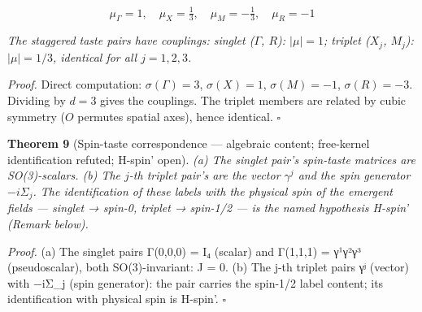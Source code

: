 \documentclass[
]{article}
\begin{document}
\[\mu_\Gamma = 1, \quad \mu_X = \tfrac{1}{3}, \quad \mu_M = -\tfrac{1}{3}, \quad \mu_R = -1\]

\emph{The staggered taste pairs have couplings: singlet (\(\Gamma\),
\(R\)): \(|\mu| = 1\); triplet (\(X_j\), \(M_j\)): \(|\mu| = 1/3\),
identical for all \(j = 1, 2, 3\).}

\emph{Proof.} Direct computation: \(\sigma(\Gamma) = 3\),
\(\sigma(X) = 1\), \(\sigma(M) = -1\), \(\sigma(R) = -3\). Dividing by
\(d = 3\) gives the couplings. The triplet members are related by cubic
symmetry (\(O\) permutes spatial axes), hence identical. \(\square\)

\textbf{Theorem 9} (Spin-taste correspondence --- algebraic content;
free-kernel identification refuted; H-spin' open). \emph{(a) The singlet
pair's spin-taste matrices are SO(3)-scalars. (b) The \(j\)-th triplet
pair's are the vector \(\gamma^j\) and the spin generator
\(-i\Sigma_j\). The identification of these labels with the physical
spin of the emergent fields --- singlet → spin-0, triplet → spin-1/2 ---
is the named hypothesis H-spin' (Remark below).}

\emph{Proof.} (a) The singlet pairs Γ(0,0,0) = I₄ (scalar) and Γ(1,1,1)
= γ¹γ²γ³ (pseudoscalar), both SO(3)-invariant: J = 0. (b) The j-th
triplet pairs γʲ (vector) with −iΣ\_j (spin generator): the pair carries
the spin-1/2 label content; its identification with physical spin is
H-spin'. \(\square\)
\end{document}
